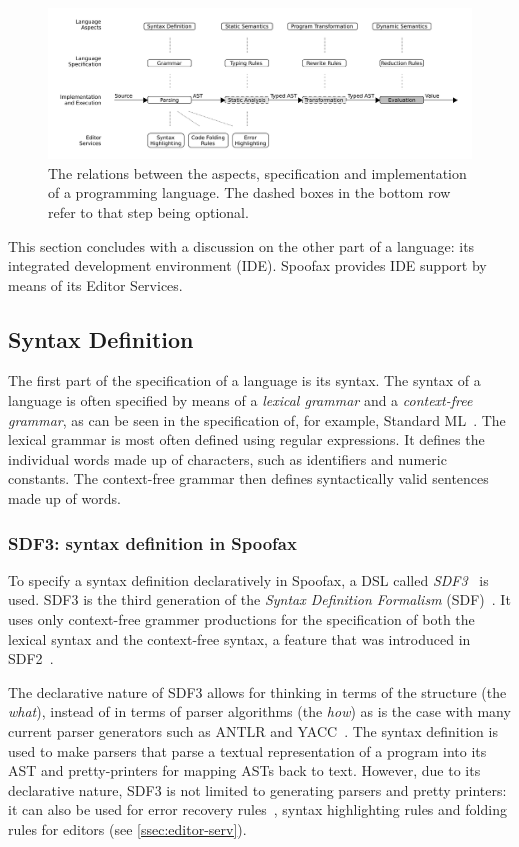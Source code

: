 \begin{figure}[t]
  \centering
  \includegraphics[width=\textwidth]{spoofax-relations}
  \caption{The relations between the aspects, specification and implementation
    of a programming language. The dashed boxes in the bottom row refer to that
    step being optional.}
  \label{fig:spoofax-relations}
\end{figure}

This section concludes with a discussion on the other part of a language: its
integrated development environment (IDE). Spoofax provides IDE support by means
of its Editor Services.

\subsection{Syntax Definition}
\label{ssec:syntax-def}
The first part of the specification of a language is its syntax. The
syntax of a language is often specified by means of a \emph{lexical
grammar} and a \emph{context-free grammar}, as can be seen in the
specification of, for example, Standard ML~\cite{Milner97}. The
lexical grammar is most often defined using regular expressions. It
defines the individual words made up of characters, such as
identifiers and numeric constants. The context-free grammar then
defines syntactically valid sentences made up of words.

\subsubsection{SDF3: syntax definition in Spoofax}
\label{ssec:orgheadline1}
To specify a syntax definition declaratively in Spoofax, a DSL called
\emph{SDF3}~\cite{Vollebregt12} is used.  SDF3 is the third generation
of the \emph{Syntax Definition Formalism} (SDF)~\cite{Heering89}. It
uses only context-free grammer productions for the specification of
both the lexical syntax and the context-free syntax, a feature that
was introduced in SDF2~\cite{Visser97}.

The declarative nature of SDF3 allows for thinking in terms of the
structure (the \emph{what}), instead of in terms of parser algorithms (the
\emph{how}) as is the case with many current parser generators such as
ANTLR and YACC~\cite{Kats10b}. The syntax definition is used to
make parsers that parse a textual representation of a program into its
AST and pretty-printers for mapping ASTs back to text. However, due to
its declarative nature, SDF3 is not limited to generating parsers and
pretty printers: it can also be used for error recovery
rules~\cite{deJonge12}, syntax highlighting rules and folding
rules for editors (see \cref{ssec:editor-serv}).

